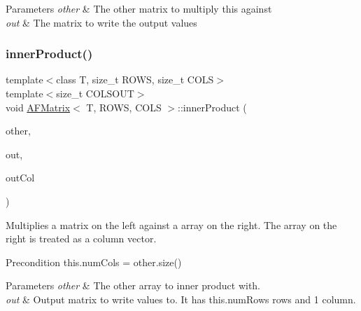 \begin{DoxyParams}{Parameters}
{\em other} & The other matrix to multiply this against \\
\hline
{\em out} & The matrix to write the output values \\
\hline
\end{DoxyParams}
\mbox{\label{class_a_f_matrix_a46b0627e74a9a013b12578734d3fe8dc}} 
\subsubsection{\texorpdfstring{inner\+Product()}{innerProduct()}\hspace{0.1cm}{\footnotesize\ttfamily [3/4]}}
{\footnotesize\ttfamily template$<$class T, size\+\_\+t R\+O\+WS, size\+\_\+t C\+O\+LS$>$ \\
template$<$size\+\_\+t C\+O\+L\+S\+O\+UT$>$ \\
void \hyperlink{class_a_f_matrix}{A\+F\+Matrix}$<$ T, R\+O\+WS, C\+O\+LS $>$\+::inner\+Product (\begin{DoxyParamCaption}\item[{array$<$ T, C\+O\+LS $>$ $\ast$}]{other,  }\item[{\hyperlink{class_a_f_matrix}{A\+F\+Matrix}$<$ T, R\+O\+WS, C\+O\+L\+S\+O\+UT $>$ $\ast$}]{out,  }\item[{int}]{out\+Col }\end{DoxyParamCaption})\hspace{0.3cm}{\ttfamily [inline]}}

Multiplies a matrix on the left against a array on the right. The array on the right is treated as a column vector. \begin{DoxyPrecond}{Precondition}
this.\+num\+Cols = other.\+size() 
\end{DoxyPrecond}

\begin{DoxyParams}{Parameters}
{\em other} & The other array to inner product with. \\
\hline
{\em out} & Output matrix to write values to. It has this.\+num\+Rows rows and 1 column. \\
\hline
\end{DoxyParams}
\mbox{\label{class_a_f_matrix_ab0d162f4bf848e2d93ed0e65ecea606b}} 

